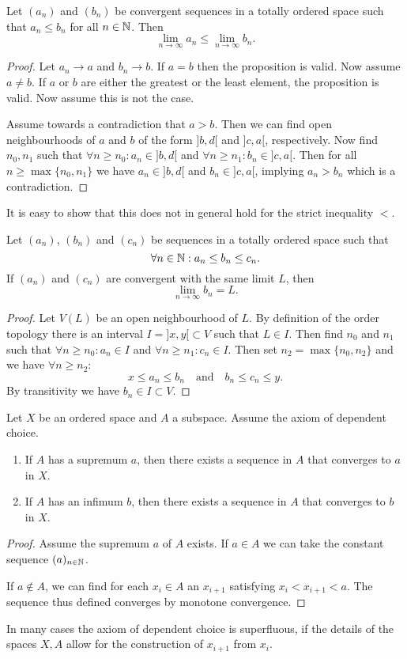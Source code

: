 \begin{proposition} \label{limitPreservesInequality}
Let $(a_n)$ and $(b_n)$ be convergent sequences in a totally ordered space such that $a_n\leq b_n$ for all $n\in\mathbb{N}$. Then
\[ \lim_{n\to \infty}a_n \leq \lim_{n\to \infty}b_n. \]
\end{proposition}
\begin{proof}
Let $a_n\to a$ and $b_n\to b$. If $a=b$ then the proposition is valid. Now assume $a\neq b$. If $a$ or $b$ are either the greatest or the least element, the proposition is valid. Now assume this is not the case.

Assume towards a contradiction that $a>b$. Then we can find open neighbourhoods of $a$ and $b$ of the form $]b,d[$ and $]c,a[$, respectively. Now find $n_0, n_1$ such that $\forall n\geq n_0: a_n \in ]b,d[$ and $\forall n\geq n_1: b_n \in ]c,a[$. 
Then for all $n \geq \max\{n_0,n_1\}$ we have $a_n\in ]b,d[$ and $b_n\in ]c,a[$, implying $a_n > b_n$ which is a contradiction.
\end{proof}
It is easy to show that this does not in general hold for the strict inequality $<$.

\begin{proposition}
Let $(a_n)$, $(b_n)$ and $(c_n)$ be sequences in a totally ordered space such that
\[ \forall n\in \mathbb{N}: a_n\leq b_n \leq c_n. \]
If $(a_n)$ and $(c_n)$ are convergent with the same limit $L$, then
\[ \lim_{n\to \infty}b_n = L. \]
\end{proposition}
\begin{proof}
Let $V(L)$ be an open neighbourhood of $L$. By definition of the order topology there is an interval $I = ]x,y[ \subset V$ such that $L\in I$. Then find $n_0$ and $n_1$ such that $\forall n\geq n_0: a_n\in I$ and $\forall n\geq n_1: c_n\in I$. Then set $n_2 = \max\{n_0,n_2\}$ and we have $\forall n\geq n_2:$
\[ x \leq a_n \leq b_n \quad \text{and} \quad  b_n \leq c_n \leq y. \]
By transitivity we have $b_n\in I \subset V$.
\end{proof}

\begin{proposition} \label{sequenceToSupInf}
Let $X$ be an ordered space and $A$ a subspace.  Assume the axiom of dependent choice.
\begin{enumerate}
\item If $A$ has a supremum $a$, then there exists a sequence in $A$ that converges to $a$ in $X$.
\item If $A$ has an infimum $b$, then there exists a sequence in $A$ that converges to $b$ in $X$.
\end{enumerate}
\end{proposition}
\begin{proof}
Assume the supremum $a$ of $A$ exists. If $a\in A$ we can take the constant sequence $(a)_{n\in \mathbb{N}}$.

If $a\notin A$, we can find for each $x_i\in A$ an $x_{i+1}$ satisfying $x_i < x_{i+1} < a$. The sequence thus defined converges by monotone convergence.
\end{proof}
In many cases the axiom of dependent choice is superfluous, if the details of the spaces $X,A$ allow for the construction of $x_{i+1}$ from $x_i$.

